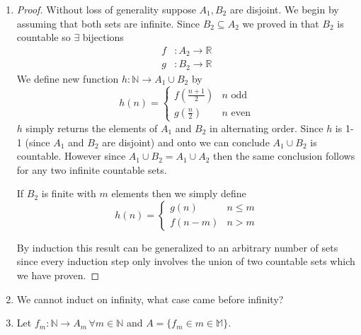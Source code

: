 \begin{enumerate}[label=(\alph*)]
    \item 
   \begin{proof}
        Without loss of generality suppose $A_1, B_2$ are disjoint. We begin by
        assuming that both sets are infinite. Since $B_2 \subseteq A_2$ we proved
        in  that $B_2$ is countable so $\exists$ bijections
        \begin{align*}
            f &: A_2 \rightarrow \mathbb{R} \\
            g &: B_2 \rightarrow \mathbb{R}
        \end{align*}
        We define new function $h : \mathbb{N} \rightarrow A_1 \cup B_2$ by
        \begin{equation*}
            h(n) = \begin{cases} 
                f(\frac{n+1}{2}) & n \text{ odd} \\
                g(\frac{n}{2}) & n \text{ even}
            \end{cases}
        \end{equation*}
        $h$ simply returns the elements of $A_1$ and $B_2$ in alternating order.
        Since $h$ is 1-1 (since $A_1$ and $B_2$ are disjoint) and onto we can
        conclude $A_1 \cup B_2$ is countable. However since $A_1 \cup B_2 = A_1 \cup A_2$
        then the same conclusion follows for any two infinite countable sets.
        
        If $B_2$ is finite with $m$ elements then we simply define
        \begin{equation*}
            h(n) = \begin{cases} 
                g(n) & n \leq m \\
                f(n-m) & n > m
            \end{cases}
        \end{equation*}

        By induction this result can be generalized to an arbitrary number of sets
        since every induction step only involves the union of two countable sets
        which we have proven.
   \end{proof}

   \item
   We cannot induct on infinity, what case came before infinity?

   \item
   Let $f_m: \mathbb{N} \rightarrow A_m \, \forall m \in \mathbb{N}$ and 
   $A = \{ f_m \in m\in \mathbb{M} \}$.


\end{enumerate}

